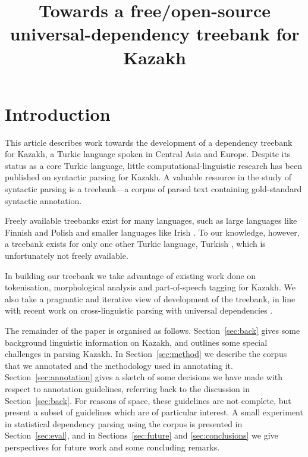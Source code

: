 \documentclass[a4paper,11pt, onecolumn,twoside]{article}
\title{Towards a free/open-source universal-dependency treebank for Kazakh}
\begin{document}
\maketitleabstract{}
\thispagestyle{firststyle}

\section{Introduction}

\addtocounter{footnote}{1}
This article describes work towards the development of a dependency treebank for Kazakh, a Turkic language spoken in Central Asia and Europe.
Despite its status as a core Turkic
language, little computational-linguistic research has been published on syntactic
parsing for Kazakh.
A valuable resource in the study of syntactic parsing is
a treebank---a corpus of parsed text containing gold-standard syntactic annotation.

Freely available treebanks exist for many languages, such as large languages like Finnish \parencite{haverinen2013tdt,voutilainen11} 
and Polish \parencite{wolinski11} and smaller languages like Irish \parencite{Lynn12}. To our knowledge, however, a treebank exists for only one other Turkic language, Turkish \parencite{Oflazer03}, which is unfortunately not freely available.

In building our treebank we take advantage of existing work done on tokenisation,
morphological analysis and part-of-speech tagging for Kazakh. We also take a pragmatic
and iterative view of development of the treebank, in line with recent work 
on cross-linguistic parsing with universal dependencies \parencite{DeMarneffe14}.

The remainder of the paper is organised as follows. Section~\ref{sec:back} gives some
background linguistic information on Kazakh, and outlines some special challenges in
parsing Kazakh. In Section~\ref{sec:method} we describe the corpus that we annotated and the methodology
used in annotating it. Section~\ref{sec:annotation} gives a sketch of some decisions
we have made with respect to annotation guidelines, referring back to the discussion in
Section~\ref{sec:back}. For reasons of space, these guidelines are not complete, but
present a subset of guidelines which are of particular interest. A small experiment
in statistical dependency parsing using the corpus is presented in Section~\ref{sec:eval},
and in Sections~\ref{sec:future} and \ref{sec:conclusions} we give perspectives
for future work and some concluding remarks.

\end{document}
